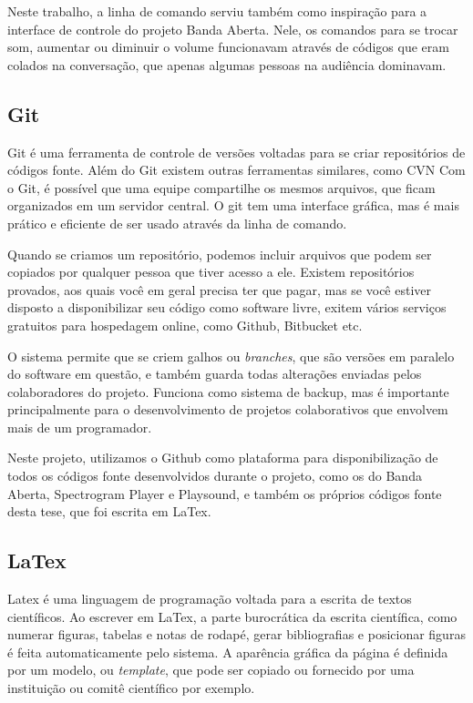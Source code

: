 Neste trabalho, a linha de comando serviu também como inspiração para a interface de controle do projeto Banda Aberta. Nele, os comandos para se trocar som, aumentar ou diminuir o volume funcionavam através de códigos que eram colados na conversação, que apenas algumas pessoas na audiência dominavam. 


\subsection{Git}
Git é uma ferramenta de controle de versões voltadas para se criar repositórios de códigos fonte. Além do Git existem outras ferramentas similares, como CVN Com o Git, é possível que uma equipe compartilhe os mesmos arquivos, que ficam organizados em um servidor central. O git tem uma interface gráfica, mas é mais prático e eficiente de ser usado através da linha de comando. 

Quando se criamos um repositório, podemos incluir arquivos que podem ser copiados por qualquer pessoa que tiver acesso a ele. Existem repositórios provados, aos quais você em geral precisa ter que pagar, mas se você estiver disposto a disponibilizar seu código como software livre, exitem vários serviços gratuitos para hospedagem online, como Github, Bitbucket etc. 

O sistema permite que se criem galhos ou \emph{branches}, que são versões em paralelo do software em questão, e também guarda todas alterações enviadas pelos colaboradores do projeto. Funciona como sistema de backup, mas é importante principalmente para o desenvolvimento de projetos colaborativos que envolvem mais de um programador. 

Neste projeto, utilizamos o Github como plataforma para disponibilização de todos os códigos fonte desenvolvidos durante o projeto, como os do Banda Aberta, Spectrogram Player e Playsound, e também os próprios códigos fonte desta tese, que foi escrita em LaTex.

\subsection{LaTex}

Latex é uma linguagem de programação voltada para a escrita de textos científicos. Ao escrever em LaTex, a parte burocrática da escrita científica, como numerar figuras, tabelas e notas de rodapé, gerar bibliografias e posicionar figuras é feita automaticamente pelo sistema. A aparência gráfica da página é definida por um modelo, ou \emph{template}, que pode ser copiado ou fornecido por uma instituição ou comitê científico por exemplo.

